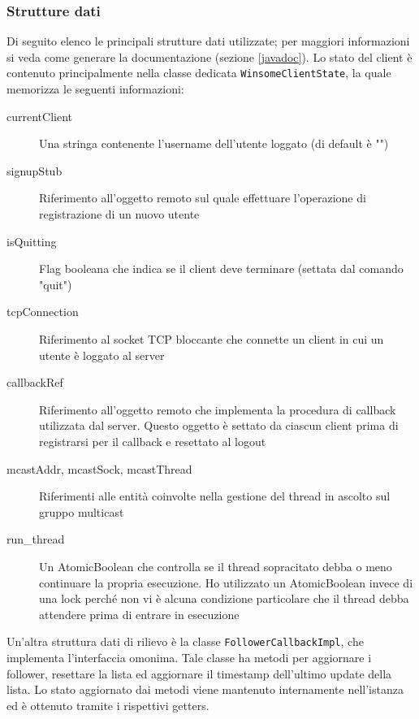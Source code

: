\subsubsection{Strutture dati}
Di seguito elenco le principali strutture dati utilizzate; per maggiori informazioni si veda come generare la documentazione (sezione \ref{javadoc}).
Lo stato del client è contenuto principalmente nella classe dedicata \verb|WinsomeClientState|, la quale memorizza le seguenti informazioni:
\begin{description}
	\item[currentClient] Una stringa contenente l'username dell'utente loggato (di default è "")
	\item[signupStub] Riferimento all'oggetto remoto sul quale effettuare l'operazione di registrazione di un nuovo utente
	\item[isQuitting] Flag booleana che indica se il client deve terminare (settata dal comando "quit")
	\item[tcpConnection] Riferimento al socket TCP bloccante che connette un client in cui un utente è loggato al server
	\item[callbackRef] Riferimento all'oggetto remoto che implementa la procedura di callback utilizzata dal server. Questo oggetto è settato da ciascun client prima di registrarsi per il callback e resettato al logout
	\item[mcastAddr, mcastSock, mcastThread] Riferimenti alle entità coinvolte nella gestione del thread in ascolto sul gruppo multicast
	\item[run\_thread] Un AtomicBoolean che controlla se il thread sopracitato debba o meno continuare la propria esecuzione. Ho utilizzato un AtomicBoolean invece di una lock perché non vi è alcuna condizione particolare che il thread debba attendere prima di entrare in esecuzione
\end{description}

Un'altra struttura dati di rilievo è la classe \verb|FollowerCallbackImpl|, che implementa l'interfaccia omonima. Tale classe ha metodi per aggiornare i follower, resettare la lista ed aggiornare il timestamp dell'ultimo update della lista. Lo stato aggiornato dai metodi viene mantenuto internamente nell'istanza ed è ottenuto tramite i rispettivi getters.
